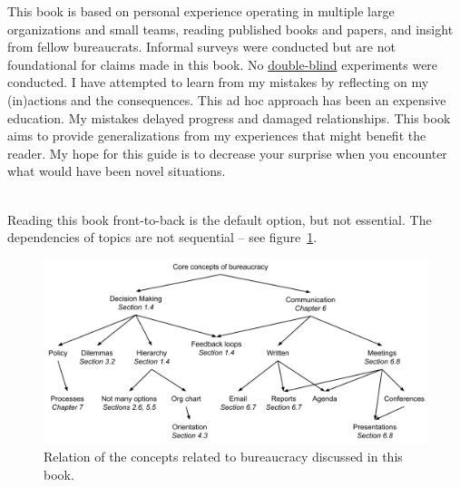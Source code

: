 This book is based on personal experience operating in multiple large organizations and small teams, reading published books and papers, and insight from fellow bureaucrats. Informal surveys were conducted but are not foundational for claims made in this book. \iftoggle{WPinmargin}{\marginpar{[Wikipedia] blinded-\\experiment}}{}
No \href{https://en.wikipedia.org/wiki/Blinded_experiment}{double-blind} 
experiments were conducted. 
I have attempted to learn from my mistakes by reflecting on my (in)actions and the consequences. This ad hoc approach has been an expensive education. My mistakes delayed progress and damaged relationships. This book aims to provide generalizations from my experiences that might benefit the reader. My hope for this guide is to decrease your surprise when you encounter what would have been novel situations.

\ \\

Reading this book front-to-back is the default option, but not essential. The dependencies of topics are not sequential -- see figure~\ref{fig:core-concepts}.

\begin{figure}[ht]
    \centering
    \includegraphics[width=1\textwidth]{images/core_concepts_map.pdf}
    \caption{Relation of the concepts related to bureaucracy discussed in this book.}
    \label{fig:core-concepts}
\end{figure}

